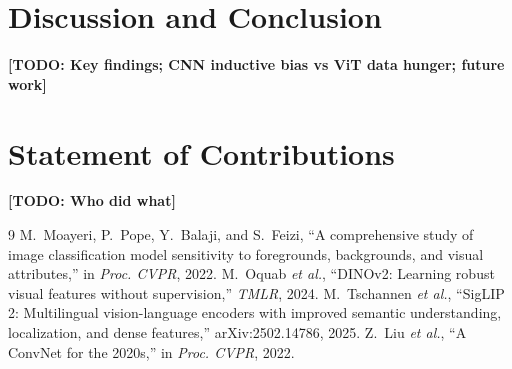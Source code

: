 \documentclass[conference]{IEEEtran}
\newcommand{\todo}[1]{\textbf{[TODO: #1]}}
\begin{document}
\section{Discussion and Conclusion}
\todo{Key findings; CNN inductive bias vs ViT data hunger; future work}

\section*{Statement of Contributions}
\todo{Who did what}

\begin{thebibliography}{9}
 M.~Moayeri, P.~Pope, Y.~Balaji, and S.~Feizi, ``A comprehensive study of image classification model sensitivity to foregrounds, backgrounds, and visual attributes,'' in \emph{Proc. CVPR}, 2022.
 M.~Oquab \emph{et al.}, ``DINOv2: Learning robust visual features without supervision,'' \emph{TMLR}, 2024.
 M.~Tschannen \emph{et al.}, ``SigLIP 2: Multilingual vision-language encoders with improved semantic understanding, localization, and dense features,'' arXiv:2502.14786, 2025.
 Z.~Liu \emph{et al.}, ``A ConvNet for the 2020s,'' in \emph{Proc. CVPR}, 2022.
\end{thebibliography}
\end{document}
